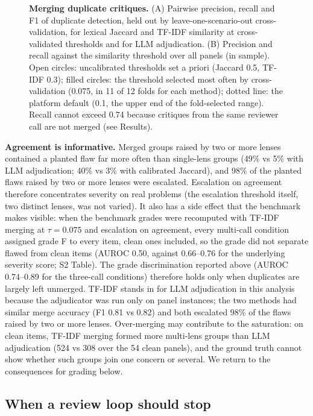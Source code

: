 \documentclass[10pt,letterpaper]{article}
\begin{document}
\begin{figure}[!h]
\caption{{\bf Merging duplicate critiques.}
(A) Pairwise precision, recall and F1 of duplicate detection, held out by leave-one-scenario-out cross-validation, for lexical Jaccard and TF-IDF similarity at cross-validated thresholds and for LLM adjudication. (B) Precision and recall against the similarity threshold over all panels (in sample). Open circles: uncalibrated thresholds set a priori (Jaccard 0.5, TF-IDF 0.3); filled circles: the threshold selected most often by cross-validation (0.075, in 11 of 12 folds for each method); dotted line: the platform default (0.1, the upper end of the fold-selected range). Recall cannot exceed 0.74 because critiques from the same reviewer call are not merged (see Results).}
\label{fig3}
\end{figure}

\textbf{Agreement is informative.} Merged groups raised by two or more lenses contained a planted flaw far more often than single-lens groups (49\% vs 5\% with LLM adjudication; 40\% vs 3\% with calibrated Jaccard), and 98\% of the planted flaws raised by two or more lenses were escalated. Escalation on agreement therefore concentrates severity on real problems (the escalation threshold itself, two distinct lenses, was not varied). It also has a side effect that the benchmark makes visible: when the benchmark grades were recomputed with TF-IDF merging at $\tau=0.075$ and escalation on agreement, every multi-call condition assigned grade F to every item, clean ones included, so the grade did not separate flawed from clean items (AUROC 0.50, against 0.66--0.76 for the underlying severity score; S2 Table). The grade discrimination reported above (AUROC 0.74--0.89 for the three-call conditions) therefore holds only when duplicates are largely left unmerged. TF-IDF stands in for LLM adjudication in this analysis because the adjudicator was run only on panel instances; the two methods had similar merge accuracy (F1 0.81 vs 0.82) and both escalated 98\% of the flaws raised by two or more lenses. Over-merging may contribute to the saturation: on clean items, TF-IDF merging formed more multi-lens groups than LLM adjudication (524 vs 308 over the 54 clean panels), and the ground truth cannot show whether such groups join one concern or several. We return to the consequences for grading below.

\subsection*{When a review loop should stop}
\end{document}

